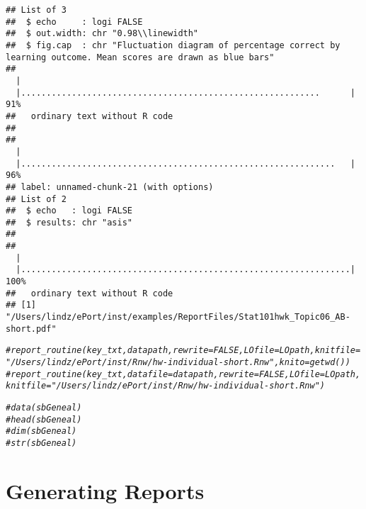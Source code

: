 \documentclass{article}\usepackage[]{graphicx}\usepackage[]{color}
\makeatletter
\newcommand{\hlcom}[1]{\textcolor[rgb]{0.678,0.584,0.686}{\textit{#1}}}%
\newenvironment{kframe}{%
 \def\at@end@of@kframe{}%
 \ifinner\ifhmode%
  \def\at@end@of@kframe{\end{minipage}}%
  \begin{minipage}{\columnwidth}%
 \fi\fi%
 \def\FrameCommand##1{\hskip\@totalleftmargin \hskip-\fboxsep
 \colorbox{shadecolor}{##1}\hskip-\fboxsep
     \hskip-\linewidth \hskip-\@totalleftmargin \hskip\columnwidth}%
 \MakeFramed {\advance\hsize-\width
   \@totalleftmargin\z@ \linewidth\hsize
   \@setminipage}}%
 {\par\unskip\endMakeFramed%
 \at@end@of@kframe}
\newenvironment{knitrout}{}{} %
\numberwithin{equation}{section} %
\makeatother
\begin{document}
\begin{knitrout}
\begin{kframe}
\begin{verbatim}
## List of 3
##  $ echo     : logi FALSE
##  $ out.width: chr "0.98\\linewidth"
##  $ fig.cap  : chr "Fluctuation diagram of percentage correct by learning outcome. Mean scores are drawn as blue bars"
## 
  |                                                                       
  |...........................................................      |  91%
##   ordinary text without R code
## 
## 
  |                                                                       
  |..............................................................   |  96%
## label: unnamed-chunk-21 (with options) 
## List of 2
##  $ echo   : logi FALSE
##  $ results: chr "asis"
## 
## 
  |                                                                       
  |.................................................................| 100%
##   ordinary text without R code
## [1] "/Users/lindz/ePort/inst/examples/ReportFiles/Stat101hwk_Topic06_AB-short.pdf"
\end{verbatim}
\end{kframe}
\end{knitrout}

\begin{knitrout}
\color{fgcolor}\begin{kframe}
\begin{alltt}
\hlcom{#report_routine(key_txt,datapath,rewrite=FALSE,LOfile=LOpath,knitfile="/Users/lindz/ePort/inst/Rnw/hw-individual-short.Rnw",knito=getwd())}
\hlcom{#report_routine(key_txt,datafile=datapath,rewrite=FALSE,LOfile=LOpath,knitfile="/Users/lindz/ePort/inst/Rnw/hw-individual-short.Rnw")}
\end{alltt}
\end{kframe}
\end{knitrout}

\begin{knitrout}
\color{fgcolor}\begin{kframe}
\begin{alltt}
\hlcom{#data(sbGeneal)}
\hlcom{#head(sbGeneal)}
\hlcom{#dim(sbGeneal)}
\hlcom{#str(sbGeneal)}
\end{alltt}
\end{kframe}
\end{knitrout}

\section{Generating Reports}
\end{document}
